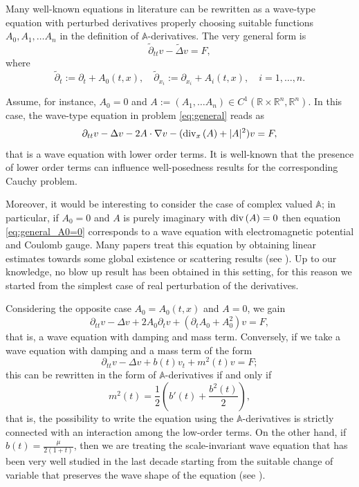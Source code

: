 \documentclass[11pt,reqno]{amsart}
\theoremstyle{definition}
\numberwithin{equation}{section}
\newcommand{\R}{\mathbb{R}}
\renewcommand{\div}{\mathinner{\mathop{{\rm div}}}}
\newcommand{\A}{\mathbb{A}}
\begin{document}
\label{sec:motivations}


Many well-known equations in literature can be rewritten as a wave-type equation with perturbed derivatives properly choosing suitable functions $A_0, A_1, \dots A_n$ in the definition of $\A$-derivatives.
The very general form is 
\begin{equation}\label{eq:general}
\tilde\partial_{tt} v-\tilde\Delta v=F,
\end{equation}
%
where 
%
\begin{equation}
\tilde{\partial}_t:=\partial_t+  A_0(t,x), \quad \tilde{\partial}_{x_i}:=\partial_{x_i}+A_i(t,x), \quad i=1,\dots, n.
\end{equation}

Assume, for instance, $A_0=0$ and $A:=( A_1,\dots A_n)\in C^1(\R\times \R^n,\R^n)$. 
%
In this case, the wave-type equation in problem \eqref{eq:general} reads as
\begin{equation} 
\label{eq:general_A0=0}
\partial_{tt}v-\Delta v - 2 A\cdot \nabla v - (\div_x(A)+|A|^2)v=F,
\end{equation}
%
that is a wave equation with lower order terms. It is well-known that the presence of lower order terms can influence well-posedness results for the corresponding Cauchy problem. 

Moreover, it would be interesting to consider the case of complex valued $\A$; in particular, if $A_0=0$ and $A$ is purely imaginary with $\div(A)=0$ then equation \eqref{eq:general_A0=0} corresponds to a wave equation with electromagnetic potential and Coulomb gauge.
Many papers treat this equation by obtaining linear estimates towards some global existence or scattering results (see \cite{DA2020,DAF2008, FV2009, GYZZ2022}). Up to our knowledge, no blow up result has been obtained in this setting, for this reason we started from the simplest case of real perturbation of the derivatives. 

Considering the opposite case $A_0=A_0(t,x)$ and $A=0$, we gain 
\[ 
\partial_{tt}v-\Delta v +2 A_0 \partial_t v + (\partial_t A_0 +A_0^2) v=F,
\]
that is, a wave equation with damping and mass term. Conversely, if we take a wave equation with damping and a mass term of the form 
\[
\partial_{tt}v-\Delta v +b(t) v_t +m^2(t) v=F;
\]
this can be rewritten in the form of $\mathbb A$-derivatives if and only if 
\[
m^2(t)=\frac{1}{2}\left(b'(t)+\frac{b^2(t)}{2}\right),
\]
that is, the possibility to write the equation using the $\mathbb A$-derivatives is strictly connected with an interaction among the low-order terms. 
On the other hand, if $b(t)=\frac{\mu}{2(1+t)}$, then we are treating the scale-invariant wave equation that has been very well studied in the last decade starting from the suitable change of variable that preserves the wave shape of the equation (see \cite{DALR2015, NPR2017, PT2021}).
\end{document}
